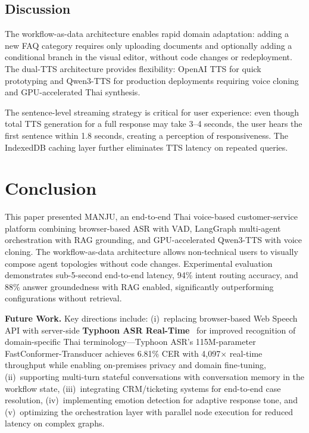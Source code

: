 \documentclass[10pt, a4paper, twocolumn]{article}
\begin{document}
\subsection{Discussion}

The workflow-as-data architecture enables rapid domain adaptation: adding a new FAQ category requires only uploading documents and optionally adding a conditional branch in the visual editor, without code changes or redeployment.
The dual-TTS architecture provides flexibility: OpenAI TTS for quick prototyping and Qwen3-TTS for production deployments requiring voice cloning and GPU-accelerated Thai synthesis.

The sentence-level streaming strategy is critical for user experience: even though total TTS generation for a full response may take 3--4 seconds, the user hears the first sentence within 1.8 seconds, creating a perception of responsiveness.
The IndexedDB caching layer further eliminates TTS latency on repeated queries.

\section{Conclusion}
\label{sec:conclusion}

This paper presented MANJU, an end-to-end Thai voice-based customer-service platform combining browser-based ASR with VAD, LangGraph multi-agent orchestration with RAG grounding, and GPU-accelerated Qwen3-TTS with voice cloning.
The workflow-as-data architecture allows non-technical users to visually compose agent topologies without code changes.
Experimental evaluation demonstrates sub-5-second end-to-end latency, 94\% intent routing accuracy, and 88\% answer groundedness with RAG enabled, significantly outperforming configurations without retrieval.

\noindent\textbf{Future Work.}
Key directions include: (i)~replacing browser-based Web Speech API with server-side \textbf{Typhoon ASR Real-Time}~\cite{sirichotedumrong2026typhoonasr} for improved recognition of domain-specific Thai terminology---Typhoon ASR's 115M-parameter FastConformer-Transducer achieves 6.81\% CER with 4{,}097$\times$ real-time throughput while enabling on-premises privacy and domain fine-tuning, (ii)~supporting multi-turn stateful conversations with conversation memory in the workflow state, (iii)~integrating CRM/ticketing systems for end-to-end case resolution, (iv)~implementing emotion detection for adaptive response tone, and (v)~optimizing the orchestration layer with parallel node execution for reduced latency on complex graphs.



\end{document}

